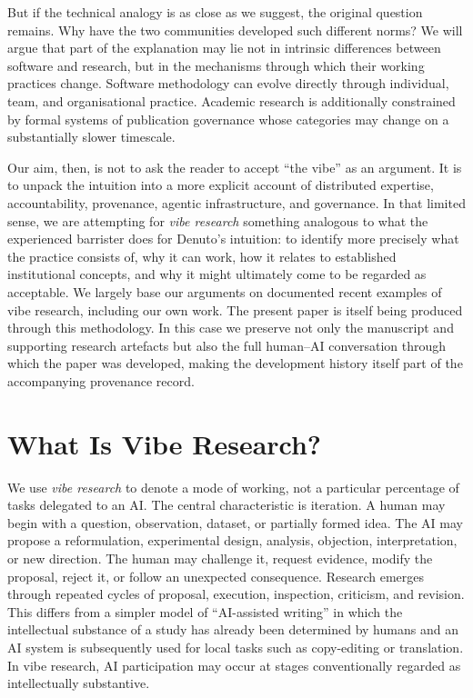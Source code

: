 \documentclass[12pt]{article}
\begin{document}
But if the technical analogy is as close as we suggest, the original question remains. Why have the two communities developed such different norms? We will argue that part of the explanation may lie not in intrinsic differences between software and research, but in the mechanisms through which their working practices change. Software methodology can evolve directly through individual, team, and organisational practice. Academic research is additionally constrained by formal systems of publication governance whose categories may change on a substantially slower timescale.

Our aim, then, is not to ask the reader to accept ``the vibe'' as an argument. It is to unpack the intuition into a more explicit account of distributed expertise, accountability, provenance, agentic infrastructure, and governance. In that limited sense, we are attempting for \emph{vibe research} something analogous to what the experienced barrister does for Denuto's intuition: to identify more precisely what the practice consists of, why it can work, how it relates to established institutional concepts, and why it might ultimately come to be regarded as acceptable.
We largely base our arguments on documented recent examples of vibe research, including our own work. The present paper is itself being produced through this methodology. In this case we preserve not only the manuscript and supporting research artefacts but also the full human--AI conversation through which the paper was developed, making the development history itself part of the accompanying provenance record.


\section{What Is Vibe Research?}

We use \emph{vibe research} to denote a mode of working, not a particular percentage of tasks delegated to an AI.
The central characteristic is iteration. A human may begin with a question, observation, dataset, or partially formed idea. The AI may propose a reformulation, experimental design, analysis, objection, interpretation, or new direction. The human may challenge it, request evidence, modify the proposal, reject it, or follow an unexpected consequence. Research emerges through repeated cycles of proposal, execution, inspection, criticism, and revision.
This differs from a simpler model of ``AI-assisted writing'' in which the intellectual substance of a study has already been determined by humans and an AI system is subsequently used for local tasks such as copy-editing or translation. In vibe research, AI participation may occur at stages conventionally regarded as intellectually substantive.
\end{document}

